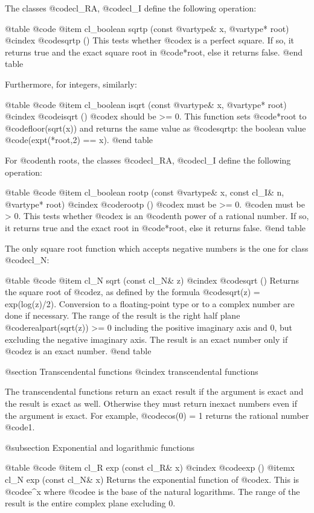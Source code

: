 The classes @code{cl_RA}, @code{cl_I} define the following operation:

@table @code
@item cl_boolean sqrtp (const @var{type}& x, @var{type}* root)
@cindex @code{sqrtp ()}
This tests whether @code{x} is a perfect square. If so, it returns true
and the exact square root in @code{*root}, else it returns false.
@end table

Furthermore, for integers, similarly:

@table @code
@item cl_boolean isqrt (const @var{type}& x, @var{type}* root)
@cindex @code{isqrt ()}
@code{x} should be >= 0. This function sets @code{*root} to
@code{floor(sqrt(x))} and returns the same value as @code{sqrtp}:
the boolean value @code{(expt(*root,2) == x)}.
@end table

For @code{n}th roots, the classes @code{cl_RA}, @code{cl_I}
define the following operation:

@table @code
@item cl_boolean rootp (const @var{type}& x, const cl_I& n, @var{type}* root)
@cindex @code{rootp ()}
@code{x} must be >= 0. @code{n} must be > 0.
This tests whether @code{x} is an @code{n}th power of a rational number.
If so, it returns true and the exact root in @code{*root}, else it returns
false.
@end table

The only square root function which accepts negative numbers is the one
for class @code{cl_N}:

@table @code
@item cl_N sqrt (const cl_N& z)
@cindex @code{sqrt ()}
Returns the square root of @code{z}, as defined by the formula
@code{sqrt(z) = exp(log(z)/2)}. Conversion to a floating-point type
or to a complex number are done if necessary. The range of the result is the
right half plane @code{realpart(sqrt(z)) >= 0}
including the positive imaginary axis and 0, but excluding
the negative imaginary axis.
The result is an exact number only if @code{z} is an exact number.
@end table


@section Transcendental functions
@cindex transcendental functions

The transcendental functions return an exact result if the argument
is exact and the result is exact as well. Otherwise they must return
inexact numbers even if the argument is exact.
For example, @code{cos(0) = 1} returns the rational number @code{1}.


@subsection Exponential and logarithmic functions

@table @code
@item cl_R exp (const cl_R& x)
@cindex @code{exp ()}
@itemx cl_N exp (const cl_N& x)
Returns the exponential function of @code{x}. This is @code{e^x} where
@code{e} is the base of the natural logarithms. The range of the result
is the entire complex plane excluding 0.

